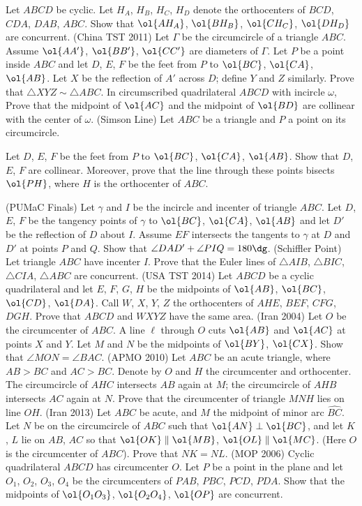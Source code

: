 \documentclass[11pt]{scrartcl}
\begin{document}
\begin{enumerate}
  \ii Let $ABCD$ be cyclic.
  Let $H_A$, $H_B$, $H_C$, $H_D$ denote the orthocenters of $BCD$, $CDA$, $DAB$, $ABC$.
  Show that $\ol{AH_A}$, $\ol{BH_B}$, $\ol{CH_C}$, $\ol{DH_D}$ are concurrent.
  \ii (China TST 2011)
  Let $\Gamma$ be the circumcircle of a triangle $ABC$.
  Assume $\ol{AA'}$, $\ol{BB'}$, $\ol{CC'}$ are diameters of $\Gamma$.
  Let $P$ be a point inside $ABC$ and let $D$, $E$, $F$ be the feet from $P$ to $\ol{BC}$, $\ol{CA}$, $\ol{AB}$.
  Let $X$ be the reflection of $A'$ across $D$; define $Y$ and $Z$ similarly.
  Prove that $\triangle XYZ \sim \triangle ABC$.
  \ii In circumscribed quadrilateral $ABCD$ with incircle $\omega$,
  Prove that the midpoint of $\ol{AC}$ and the midpoint of $\ol{BD}$ are collinear with the center of $\omega$.
  \ii (Simson Line) Let $ABC$ be a triangle and $P$ a point on its circumcircle.
  \begin{enumerate}[(a)]
    \ii Let $D$, $E$, $F$ be the feet from $P$ to $\ol{BC}$, $\ol{CA}$, $\ol{AB}$.
    Show that $D$, $E$, $F$ are collinear.
    \ii Moreover, prove that the line through these points bisects $\ol{PH}$,
    where $H$ is the orthocenter of $ABC$.
  \end{enumerate}
  \ii (PUMaC Finals) Let $\gamma$ and $I$ be the incircle and incenter of triangle $ABC$.
  Let $D$, $E$, $F$ be the tangency points of $\gamma$ to $\ol{BC}$, $\ol{CA}$, $\ol{AB}$
  and let $D'$ be the reflection of $D$ about $I$.
  Assume $EF$ intersects the tangents to $\gamma$ at $D$ and $D'$ at points $P$ and $Q$.
  Show that $\angle DAD' + \angle PIQ = 180\dg$.
  \ii (Schiffler Point) Let triangle $ABC$ have incenter $I$.
  Prove that the Euler lines of $\triangle AIB$, $\triangle BIC$, $\triangle CIA$, $\triangle ABC$ are concurrent.
  \ii (USA TST 2014) Let $ABCD$ be a cyclic quadrilateral and let
  $E$, $F$, $G$, $H$ be the midpoints of $\ol{AB}$, $\ol{BC}$, $\ol{CD}$, $\ol{DA}$.
  Call $W$, $X$, $Y$, $Z$ the orthocenters of $AHE$, $BEF$, $CFG$, $DGH$.
  Prove that $ABCD$ and $WXYZ$ have the same area.
  \ii (Iran 2004) Let $O$ be the circumcenter of $ABC$.
  A line $\ell$ through $O$ cuts $\ol{AB}$ and $\ol{AC}$ at points $X$ and $Y$.
  Let $M$ and $N$ be the midpoints of $\ol{BY}$, $\ol{CX}$. Show that $\angle MON = \angle BAC$.
  \ii (APMO 2010) Let $ABC$ be an acute triangle, where $AB > BC$ and $AC > BC$.
  Denote by $O$ and $H$ the circumcenter and orthocenter.
  The circumcircle of $AHC$ intersects $AB$ again at $M$;
  the circumcircle of $AHB$ intersects $AC$ again at $N$.
  Prove that the circumcenter of triangle $MNH$ lies on line $OH$.
  \ii (Iran 2013) Let $ABC$ be acute, and $M$ the midpoint of minor arc $\widehat{BC}$.
  Let $N$ be on the circumcircle of $ABC$ such that $\ol{AN} \perp \ol{BC}$,
  and let $K$, $L$ lie on $AB$, $AC$ so that $\ol{OK} \parallel \ol{MB}$, $\ol{OL} \parallel \ol{MC}$.
  (Here $O$ is the circumcenter of $ABC$). Prove that $NK = NL$.
  \ii (MOP 2006) Cyclic quadrilateral $ABCD$ has circumcenter $O$.
  Let $P$ be a point in the plane
  and let $O_1$, $O_2$, $O_3$, $O_4$ be the circumcenters of $PAB$, $PBC$, $PCD$, $PDA$.
  Show that the midpoints of
  $\ol{O_1 O_3}$, $\ol{O_2O_4}$, $\ol{OP}$ are concurrent.
\end{enumerate}
\end{document}
